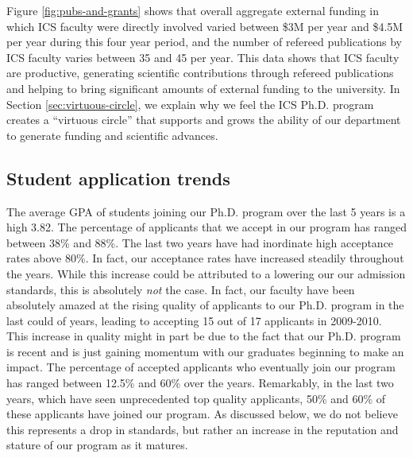 \documentclass[12pt]{article}
\begin{document}
Figure \ref{fig:pubs-and-grants} shows that overall aggregate external
funding in which ICS faculty were directly involved varied between \$3M per
year and \$4.5M per year during this four year period, and the number of
refereed publications by ICS faculty varies between 35 and 45 per year.
This data shows that ICS faculty are productive, generating scientific
contributions through refereed publications and helping to bring
significant amounts of external funding to the university. In Section
\ref{sec:virtuous-circle}, we explain why we feel the ICS Ph.D. program
creates a ``virtuous circle'' that supports and grows the ability of our
department to generate funding and scientific advances. 


\subsection{Student application trends}

The average GPA of students joining our Ph.D. program over the last 5 years
is a high 3.82. The percentage of applicants that we accept in our program
has ranged between 38\% and 88\%. The last two years have had inordinate
high acceptance rates above 80\%. In fact, our acceptance rates have
increased steadily throughout the years. While this increase could be
attributed to a lowering our our admission standards, this is absolutely
\emph{not} the case. In fact, our faculty have been absolutely amazed at
the rising quality of applicants to our Ph.D. program in the last could of
years, leading to accepting 15 out of 17 applicants in 2009-2010. This
increase in quality might in part be due to the fact that our Ph.D. program
is recent and is just gaining momentum with our graduates beginning to make
an impact.  The percentage of accepted applicants who eventually join our
program has ranged between 12.5\% and 60\% over the years. Remarkably, in
the last two years, which have seen unprecedented top quality applicants,
50\% and 60\% of these applicants have joined our program. As discussed
below, we do not believe this represents a drop in standards, but rather an increase
in the reputation and stature of our program as it matures.
\end{document}

